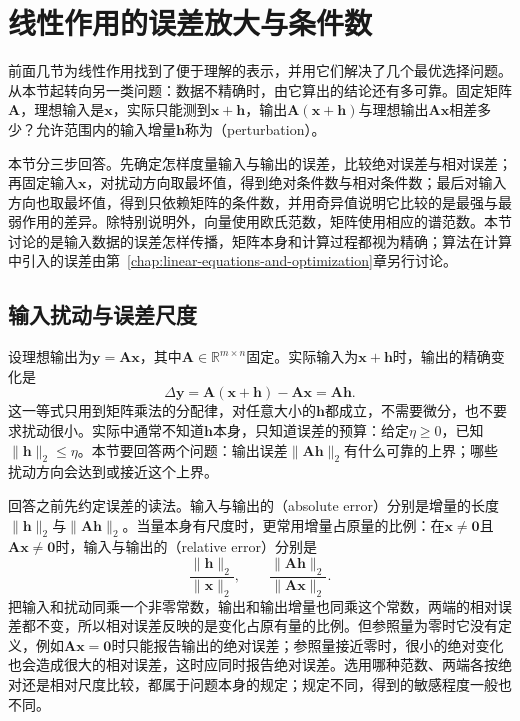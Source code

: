 
\section{线性作用的误差放大与条件数}
\label{sec:ls-perturbation}
\label{sec:linear-algebra-stability}
\label{sec:matrix-analysis-conditioning-perturbation}

前面几节为线性作用找到了便于理解的表示，并用它们解决了几个最优选择问题。从本节起转向另一类问题：数据不精确时，由它算出的结论还有多可靠。固定矩阵$\bm A$，理想输入是$\bm x$，实际只能测到$\bm x+\bm h$，输出$\bm A(\bm x+\bm h)$与理想输出$\bm A\bm x$相差多少？允许范围内的输入增量$\bm h$称为（perturbation）。

本节分三步回答。先确定怎样度量输入与输出的误差，比较绝对误差与相对误差；再固定输入$\bm x$，对扰动方向取最坏值，得到绝对条件数与相对条件数；最后对输入方向也取最坏值，得到只依赖矩阵的条件数，并用奇异值说明它比较的是最强与最弱作用的差异。除特别说明外，向量使用欧氏范数，矩阵使用相应的谱范数。本节讨论的是输入数据的误差怎样传播，矩阵本身和计算过程都视为精确；算法在计算中引入的误差由第~\ref{chap:linear-equations-and-optimization}章另行讨论。

\subsection{输入扰动与误差尺度}
\label{sec:ls-input-error-scales}

设理想输出为$\bm y=\bm A\bm x$，其中$\bm A\in\mathbb R^{m\times n}$固定。实际输入为$\bm x+\bm h$时，输出的精确变化是
\[
 \Delta\bm y=\bm A(\bm x+\bm h)-\bm A\bm x=\bm A\bm h .
\]
这一等式只用到矩阵乘法的分配律，对任意大小的$\bm h$都成立，不需要微分，也不要求扰动很小。实际中通常不知道$\bm h$本身，只知道误差的预算：给定$\eta\geq0$，已知$\lVert\bm h\rVert_2\leq\eta$。本节要回答两个问题：输出误差$\lVert\bm A\bm h\rVert_2$有什么可靠的上界；哪些扰动方向会达到或接近这个上界。

回答之前先约定误差的读法。输入与输出的（absolute error）分别是增量的长度$\lVert\bm h\rVert_2$与$\lVert\bm A\bm h\rVert_2$。当量本身有尺度时，更常用增量占原量的比例：在$\bm x\neq\bm0$且$\bm A\bm x\neq\bm0$时，输入与输出的（relative error）分别是
\[
 \frac{\lVert\bm h\rVert_2}{\lVert\bm x\rVert_2},\qquad
 \frac{\lVert\bm A\bm h\rVert_2}{\lVert\bm A\bm x\rVert_2}.
\]
把输入和扰动同乘一个非零常数，输出和输出增量也同乘这个常数，两端的相对误差都不变，所以相对误差反映的是变化占原有量的比例。但参照量为零时它没有定义，例如$\bm A\bm x=\bm0$时只能报告输出的绝对误差；参照量接近零时，很小的绝对变化也会造成很大的相对误差，这时应同时报告绝对误差。选用哪种范数、两端各按绝对还是相对尺度比较，都属于问题本身的规定；规定不同，得到的敏感程度一般也不同。

